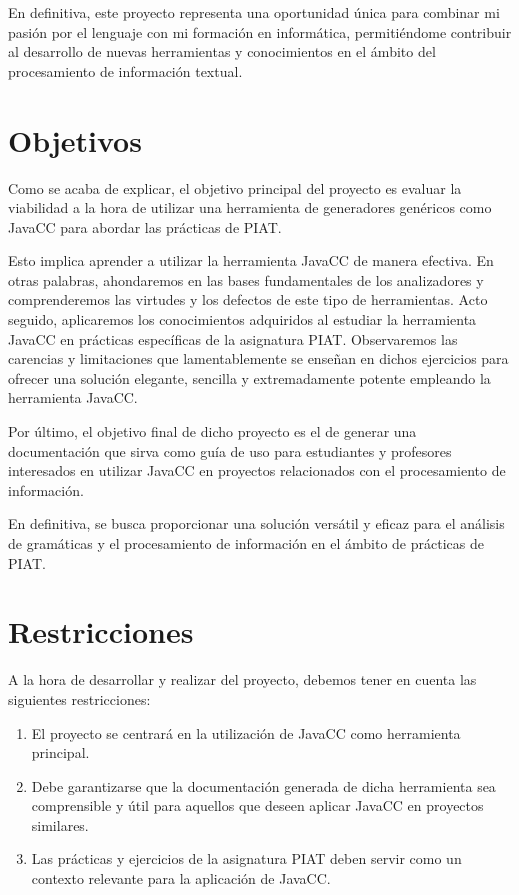 En definitiva, este proyecto representa una oportunidad única para combinar mi pasión por el lenguaje con mi formación en informática, permitiéndome contribuir al desarrollo de nuevas herramientas y conocimientos en el ámbito del procesamiento de información textual.

\section{Objetivos}

Como se acaba de explicar, el objetivo principal del proyecto es evaluar la viabilidad a la hora de utilizar una herramienta de generadores genéricos como JavaCC para abordar las prácticas de PIAT. 

Esto implica aprender a utilizar la herramienta JavaCC de manera efectiva. En otras palabras, ahondaremos en las bases fundamentales de los analizadores y comprenderemos las virtudes y los defectos de este tipo de herramientas. Acto seguido, aplicaremos los conocimientos adquiridos al estudiar la herramienta JavaCC en prácticas específicas de la asignatura PIAT. Observaremos las carencias y limitaciones que lamentablemente se enseñan en dichos ejercicios para ofrecer una solución elegante, sencilla y extremadamente potente empleando la herramienta JavaCC.


Por último, el objetivo final de dicho proyecto es el de generar una documentación que sirva como guía de uso para estudiantes y profesores interesados en utilizar JavaCC en proyectos relacionados con el procesamiento de información. 

En definitiva, se busca proporcionar una solución versátil y eficaz para el análisis de gramáticas y el procesamiento de información en el ámbito de prácticas de PIAT.

\section{Restricciones}
	A la hora de desarrollar y realizar del proyecto, debemos tener en cuenta las siguientes restricciones:
\begin{enumerate}
    \item El proyecto se centrará en la utilización de JavaCC como herramienta principal. 
    \item Debe garantizarse que la documentación generada de dicha herramienta sea comprensible y útil para aquellos que deseen aplicar JavaCC en proyectos similares.
    \item Las prácticas y ejercicios de la asignatura PIAT deben servir como un contexto relevante para la aplicación de JavaCC.
\end{enumerate}

